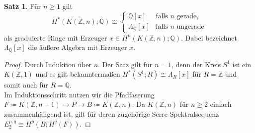 \documentclass[11pt, a4paper, german]{article}
\theoremstyle{definition}
\newtheorem{satz}[lem]{Satz}
\theoremstyle{remark}
\newcommand{\Z}{\mathbb{Z}} %
\newcommand{\Q}{\mathbb{Q}} %
\begin{document}
\begin{satz}\label{rational-homology-kzn}
  Für $n \geq 1$ gilt
  \vspace{-1em}
  \[
    H^*(K(\Z, n); \Q) \cong \begin{cases}
      \Q[x] & \text{falls $n$ gerade}, \\
      \Lambda_\Q[x] & \text{falls $n$ ungerade}
    \end{cases}
  \]
  als graduierte Ringe mit Erzeuger $x \in H^n(K(\Z, n); \Q)$.
  Dabei bezeichnet $\Lambda_\Q[x]$ die äußere Algebra mit Erzeuger $x$.
\end{satz}

\begin{proof}
  Durch Induktion über $n$.
  Der Satz gilt für $n = 1$, denn der Kreis $S^1$ ist ein $K(\Z, 1)$ und es gilt bekanntermaßen $H^*(S^1; R) \cong \Lambda_R[x]$ für $R = \Z$ und somit auch für $R = \Q$. \\
  Im Induktionsschritt nutzen wir die Pfadfaserung $F \coloneqq K(\Z, n{-}1) \to P \to B \coloneqq K(\Z, n)$. Da $K(\Z, n)$ für $n \geq 2$ einfach zusammenhängend ist, gilt für deren zugehörige Serre-Spektralsequenz
  $E_2^{p,q} \cong H^p(B; H^q(F))$.

  \vspace{0.5cm}


\end{proof}
\end{document}
